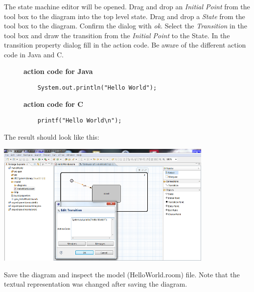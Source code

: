 The state machine editor will be opened. Drag and drop an \textit{Initial Point} from the tool box to the 
diagram into the top level state. Drag and drop a \textit{State} from the tool box to the diagram. Confirm the dialog with
\textit{ok}. Select the \textit{Transition} in the tool box and draw the transition from the \textit{Initial Point} to the State.
In the transition property dialog fill in the action code.
Be aware of the different action code in Java and C.

\begin{figure}[ht]
\begin{minipage}[b]{0.45\linewidth}
	\begin{mdframed}
	\textbf{action code for Java}
	\begin{verbatim}
	System.out.println("Hello World");
	\end{verbatim}
	\end{mdframed}
\end{minipage}
\hspace{0.5cm}
\begin{minipage}[b]{0.45\linewidth}
	\begin{mdframed}
	\textbf{action code for C}
	\begin{verbatim}
	printf("Hello World\n");
	\end{verbatim}
	\end{mdframed}
\end{minipage}
\end{figure}

 
The result should look like this:

\includegraphics[width=0.8\textwidth]{images/015-HelloWorld04.png}

Save the diagram and inspect the model (HelloWorld.room) file. Note that the textual representation was changed after saving 
the diagram.


